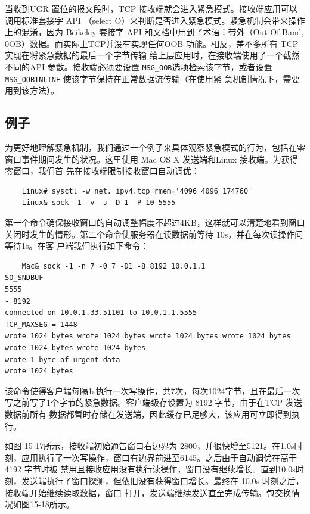 当收到UGR 置位的报文段时，TCP 接收端就会进入紧急模式。接收端应用可以调用标准套接字 API （select O）来判断是否进入紧急模式。紧急机制会带来操作上的混淆，因为
Beikeley 套接字 API 和文档中用到了术语：带外（Out-Of-Band, 0OB）数据。而实际上TCP并没有实现任何OOB 功能。相反，差不多所有 TCP实现在将紧急数据的最后一个字节传输
给上层应用时，在接收端使用了一个截然不同的API 参数。接收端必须要设置 \verb|MSG_OOB|选项检索该字节，或者设置 \verb|MSG_OOBINLINE| 使该字节保持在正常数据流传输（在使用紧
急机制情况下，需要用到该方法）。

\subsection{例子}
为更好地理解紧急机制，我们通过一个例子来具体观察紧急模式的行为，包括在零窗口事件期间发生的状况。这里使用 Mac OS X 发送端和Linux 接收端。为获得零窗口，我们首
先在接收端限制接收窗口自动调优：

\begin{verbatim}
    Linux# sysctl -w net. ipv4.tcp_rmem='4096 4096 174760'
    Linux& sock -1 -v -в -D 1 -P 10 5555
\end{verbatim}

第一个命令确保接收窗口的自动调整幅度不超过4KB，这样就可以清楚地看到窗口关闭时发生的情形。第二个命令使服务器在读数据前等待 10s，并在每次读操作间等待1s。在客
户端我们执行如下命令：
\begin{verbatim}
    Mac& sock -1 -n 7 -0 7 -D1 -8 8192 10.0.1.1
SO_SNDBUF
5555
- 8192
connected on 10.0.1.33.51101 to 10.0.1.1.5555
TCP_MAXSEG = 1448
wrote 1024 bytes wrote 1024 bytes wrote 1024 bytes wrote 1024 bytes wrote 1024 bytes wrote 1024 bytes
wrote 1 byte of urgent data
wrote 1024 bytes
\end{verbatim}

该命令使得客户端每隔1s执行一次写操作，共7次，每次1024字节，且在最后一次写之前写了1个字节的紧急数据。客户端级存设置为 8192 字节，由于在TCP 发送数据前所有
数据都暂时存储在发送端，因此缓存已足够大，该应用可立即得到执行。

如图 15-17所示，接收端初始通告窗口右边界为 2800，并很快增至5121。在1.0s时刻，应用执行了一次写操作，窗口有边界前进至6145。之后由于自动调优在高于4192 字节时被
禁用且接收应用没有执行读操作，窗口没有继续增长。直到10.0s时刻，发送端执行了窗口探测，但依旧没有获得窗口增长。最终在 10.0s 时刻之后，接收端开始继续读取数据，窗口
打开，发送端继续发送直至完成传输。包交换情况如图15-18所示。

